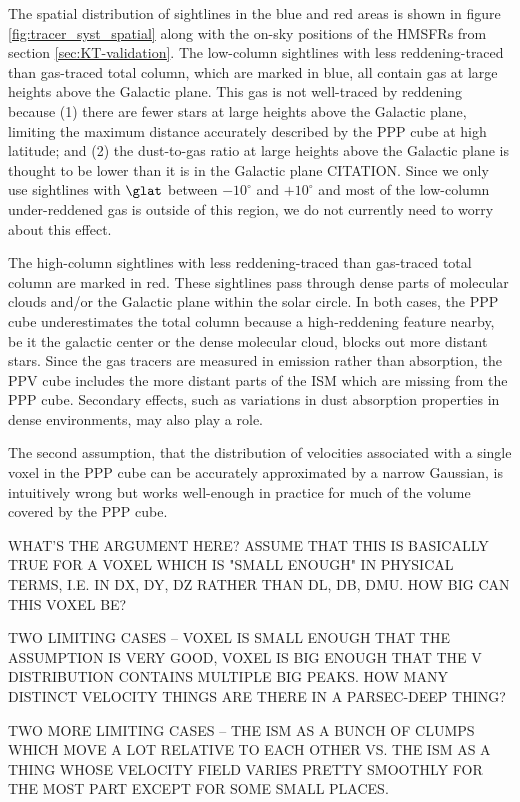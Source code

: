 The spatial distribution of sightlines in the blue and red areas is shown in figure \ref{fig:tracer_syst_spatial} along with the on-sky positions of the HMSFRs from section \ref{sec:KT-validation}. 
The low-column sightlines with less reddening-traced than gas-traced total column, which are marked in blue, all contain gas at large heights above the Galactic plane. 
This gas is not well-traced by reddening because (1) there are fewer stars at large heights above the Galactic plane, limiting the maximum distance accurately described by the PPP cube at high latitude; and (2) the dust-to-gas ratio at large heights above the Galactic plane is thought to be lower than it is in the Galactic plane CITATION. 
Since we only use sightlines with $\glat$ between $-10^\circ$ and $+10^\circ$ and most of the low-column under-reddened gas is outside of this region, we do not currently need to worry about this effect.

The high-column sightlines with less reddening-traced than gas-traced total column are marked in red.
These sightlines pass through dense parts of molecular clouds and/or the Galactic plane within the solar circle. 
In both cases, the PPP cube underestimates the total column because a high-reddening feature nearby, be it the galactic center or the dense molecular cloud, blocks out more distant stars. 
Since the gas tracers are measured in emission rather than absorption, the PPV cube includes the more distant parts of the ISM which are missing from the PPP cube. 
Secondary effects, such as variations in dust absorption properties in dense environments, may also play a role.


The second assumption, that the distribution of velocities associated with a single voxel in the PPP cube can be accurately approximated by a narrow Gaussian, is intuitively wrong but works well-enough in practice for much of the volume covered by the PPP cube.

WHAT'S THE ARGUMENT HERE? ASSUME THAT THIS IS BASICALLY TRUE FOR A VOXEL WHICH IS "SMALL ENOUGH" IN PHYSICAL TERMS, I.E. IN DX, DY, DZ RATHER THAN DL, DB, DMU. HOW BIG CAN THIS VOXEL BE? 

TWO LIMITING CASES -- VOXEL IS SMALL ENOUGH THAT THE ASSUMPTION IS VERY GOOD, VOXEL IS BIG ENOUGH THAT THE V DISTRIBUTION CONTAINS MULTIPLE BIG PEAKS. HOW MANY DISTINCT VELOCITY THINGS ARE THERE IN A PARSEC-DEEP THING?

TWO MORE LIMITING CASES -- THE ISM AS A BUNCH OF CLUMPS WHICH MOVE A LOT RELATIVE TO EACH OTHER VS. THE ISM AS A THING WHOSE VELOCITY FIELD VARIES PRETTY SMOOTHLY FOR THE MOST PART EXCEPT FOR SOME SMALL PLACES. 

